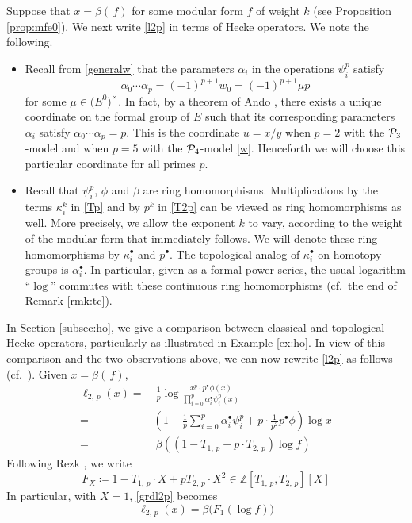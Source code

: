 \documentclass{gtpart}
\theoremstyle{definition}
\theoremstyle{remark}
\newcommand{\mb}[1]{\mathbb{#1}}
\newcommand{\CP}{{\cal P}}
\newcommand{\BZ}{{\mb Z}}
\newcommand{\A}{\alpha}
\newcommand{\B}{\beta}
\newcommand{\K}{\kappa}
\newcommand{\ce}{\coloneqq}
\renewcommand{\=}{\approx}
\renewcommand{\-}{\sim}
\numberwithin{equation}{section}
\numberwithin{thm}{section}
\begin{document}
Suppose that $x = \B(\,f)$ for some modular form $f$ of weight $k$ (see 
Proposition \ref{prop:mfe0}).  We next write \eqref{l2p} in terms of Hecke 
operators.  We note the following.  
\begin{itemize}
 \item Recall from \eqref{generalw} that the parameters $\A_i$ in the operations 
 $\psi^p_i$ satisfy 
 \[
  \A_0 \cdots \A_p = (-1)^{p+1} w_0 = (-1)^{p+1} \mu p 
 \]
 for some $\mu \in \big( E^0 \big)^{\!\times}$.  In fact, by a theorem of Ando 
 \cite[Theorem 4]{Ando95}, there exists a unique coordinate on the formal group 
 of $E$ such that its corresponding parameters $\A_i$ satisfy 
 $\A_0 \cdots \A_p = p$.  This is the coordinate $u = x/y$ when $p = 2$ with the 
 $\CP_3$-model \cite[Section 3]{h2p2} and when $p = 5$ with the $\CP_4$-model 
 \eqref{w}.  Henceforth we will choose this particular coordinate for all primes 
 $p$.  

 \item Recall that $\psi^p_i$, $\phi$ and $\B$ are ring homomorphisms.  
 Multiplications by the terms $\K_i^k$ in \eqref{Tp} and by $p^k$ in \eqref{T2p} 
 can be viewed as ring homomorphisms as well.  More precisely, we allow the 
 exponent $k$ to vary, according to the weight of the modular form that 
 immediately follows.  We will denote these ring homomorphisms by $\K_i^\bullet$ 
 and $p^\bullet$.  The topological analog of $\K_i^\bullet$ on homotopy groups 
 is $\A_i^\bullet$.  In particular, given as a formal power series, the usual 
 logarithm ``$\log$'' commutes with these continuous ring homomorphisms (cf.~the 
 end of Remark \ref{rmk:tc}).  
\end{itemize}
In Section \ref{subsec:ho}, we give a comparison between classical and 
topological Hecke operators, particularly as illustrated in Example \ref{ex:ho}.  
In view of this comparison and the two observations above, we can now rewrite 
\eqref{l2p} as follows (cf.~\cite[1.12]{log}).  Given $x = \B(\,f)$, 
\begin{equation}
 \label{grdl2p}
 \begin{split}
  \ell_{2,\,p}(x) = & ~ \frac{1}{p} \log \frac{x^p \cdot p^\bullet 
                      \phi(x)}{\prod_{i=0}^p \A_i^\bullet \psi^p_i(x)} \\
                  = & \left( 1 - \frac{1}{p} \sum_{i = 0}^p \A_i^\bullet 
                      \psi^p_i + p \cdot \frac{1}{p^2} p^\bullet \phi \right) 
                      \log x \\
                  = & ~ \B \left( (1 - T_{1,\,p} + p \cdot T_{2,\,p}) 
                      \log f \right) 
 \end{split}
\end{equation}
Following Rezk \cite[1.12]{log}, we write 
\begin{equation}
 \label{FX}
 F_X \ce 1 - T_{1,\,p} \cdot X + p T_{2,\,p} \cdot X^2 \in 
 \BZ[T_{1,\,p},T_{2,\,p}][X] 
\end{equation}
In particular, with $X = 1$, \eqref{grdl2p} becomes 
\begin{equation}
 \label{F1}
 \ell_{2,\,p}(x) = \B \big( F_1 (\log f) \big) 
\end{equation}
\end{document}
